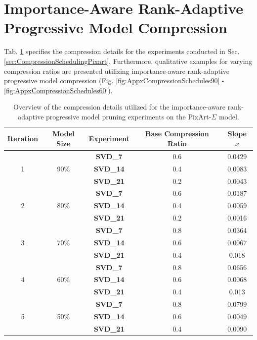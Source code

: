 \section{Importance-Aware Rank-Adaptive Progressive Model Compression}
\label{appx:ImpAwRanAdProgComp}
Tab. \ref{tab:PixArtAppendixCompression_iterations} specifies the compression details for the experiments conducted in Sec. \ref{sec:CompressionSchedulingPixart}. Furthermore, qualitative examples for varying compression ratios are presented utilizing importance-aware rank-adaptive progressive model compression (Fig. \ref{fig:AppxCompressionSchedules90} - \ref{fig:AppxCompressionSchedules60}).
\begin{table}[H]
	\centering
\caption[Compression Details: Importance-Aware Rank-Adaptive Progressive Model Pruning]{Overview of the compression details utilized for the importance-aware rank-adaptive progressive model pruning experiments on the PixArt-$\Sigma$ model.}
	\label{tab:PixArtAppendixCompression_iterations}
	\begin{tabular}{ccccc}
		\toprule
		\textbf{Iteration} &\textbf{Model Size} & \textbf{Experiment} & \textbf{Base Compression Ratio} & \textbf{Slope} $x$\\
		\midrule
		\multirow{3}{*}{1} 
		& \multirow{3}{*}{90\%}  
		& \textbf{SVD\_7} & 0.6 & 0.0429 \\
		&  &   \textbf{SVD\_14} & 0.4 & 0.0083 \\
		&  &  \textbf{SVD\_21}  & 0.2 & 0.0043
		 \\
		\midrule
		\multirow{3}{*}{2} 
		& \multirow{3}{*}{80\%} 
		& \textbf{SVD\_7} & 0.6 & 0.0187 \\
		&  &    \textbf{SVD\_14} & 0.4 & 0.0059 \\
		&  & \textbf{SVD\_21}  & 0.2 & 0.0016
		 \\
		\midrule
		\multirow{3}{*}{3} 
		& \multirow{3}{*}{70\%}  
		& \textbf{SVD\_7} & 0.8 & 0.0364  \\
		&  &    \textbf{SVD\_14} & 0.6  & 0.0067 \\
		&  & \textbf{SVD\_21}  & 0.4 & 0.018
		  \\
		\midrule
		\multirow{3}{*}{4} 
		& \multirow{3}{*}{60\%}  
		& \textbf{SVD\_7} & 0.8 & 0.0656 \\
		&  &    \textbf{SVD\_14} & 0.6  & 0.0068 \\
		&  & \textbf{SVD\_21}  & 0.4 & 0.013
		 \\
		\midrule
		\multirow{3}{*}{5} 
		& \multirow{3}{*}{50\%}  
		& \textbf{SVD\_7} & 0.8 & 0.0799  \\
		&  &    \textbf{SVD\_14} & 0.6 & 0.0049 \\
		&  & \textbf{SVD\_21}  & 0.4 & 0.0090  \\
		\bottomrule
		
	\end{tabular}
\end{table}



